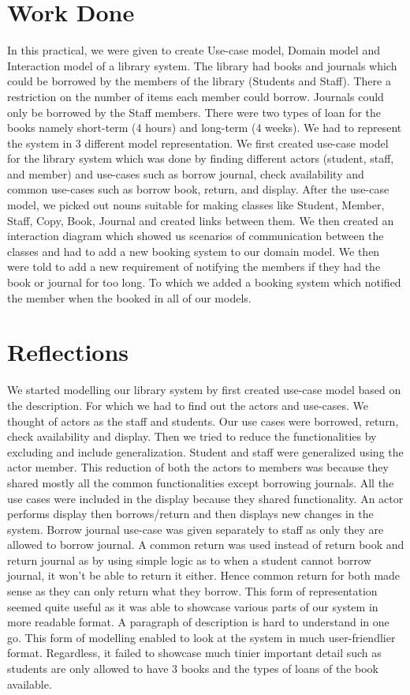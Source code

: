 \section{Work Done}

In this practical, we were given to create Use-case model, Domain model and Interaction model of a library system. The library had books and journals which could be borrowed by the members of the library (Students and Staff). There a restriction on the number of items each member could borrow. Journals could only be borrowed by the Staff members. There were two types of loan for the books namely short-term (4 hours) and long-term (4 weeks). We had to represent the system in 3 different model representation. We first created use-case model for the library system which was done by finding different actors (student, staff, and member) and use-cases such as borrow journal, check availability and common use-cases such as borrow book, return, and display. After the use-case model, we picked out nouns suitable for making classes like Student, Member, Staff, Copy, Book, Journal and created links between them. We then created an interaction diagram which showed us scenarios of communication between the classes and had to add a new booking system to our domain model. We then were told to add a new requirement of notifying the members if they had the book or journal for too long. To which we added a booking system which notified the member when the booked in all of our models.

\section{Reflections}

We started modelling our library system by first created use-case model based on the description. For which we had to find out the actors and use-cases. We thought of actors as the staff and students. Our use cases were borrowed, return, check availability and display. Then we tried to reduce the functionalities by excluding and include generalization. Student and staff were generalized using the actor member. This reduction of both the actors to members was because they shared mostly all the common functionalities except borrowing journals. All the use cases were included in the display because they shared functionality. An actor performs display then borrows/return and then displays new changes in the system. Borrow journal use-case was given separately to staff as only they are allowed to borrow journal. A common return was used instead of return book and return journal as by using simple logic as to when a student cannot borrow journal, it won't be able to return it either. Hence common return for both made sense as they can only return what they borrow. This form of representation seemed quite useful as it was able to showcase various parts of our system in more readable format. A paragraph of description is hard to understand in one go. This form of modelling enabled to look at the system in much user-friendlier format. Regardless, it failed to showcase much tinier important detail such as students are only allowed to have 3 books and the types of loans of the book available.

